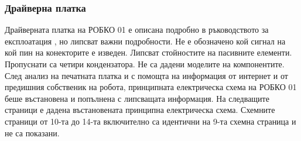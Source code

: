 \subsubsection{Драйверна платка}
\indent{}
Драйверната платка на РОБКО 01 е описана подробно в ръководството за експлоатация
\cite{robko-man}, но липсват важни подробности. Не е обозначено кой сигнал на кой пин на конекторите е изведен. Липсват стойностите на пасивните елементи. Пропуснати са четири кондензатора. Не са дадени моделите на компонентите.\\
\indent{}
След анализ на печатната платка и с помощта на информация от интернет и от предишния собственик на робота, принципната електрическа схема на РОБКО 01 беше въстановена и попълнена с липсващата информация. На следващите страници е дадена въстановената принципна електрическа схема. Схемните страници от 10-та до 14-та включително са идентични на 9-та схемна страница и не са показани.

